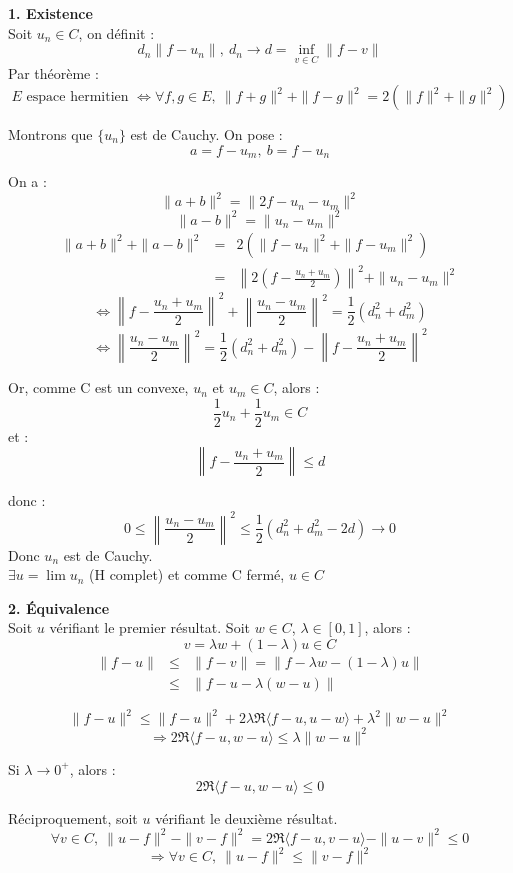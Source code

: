 \begin{dem}
	\textbf{1. Existence}\\
	Soit $u_n\in C$, on définit : 
	\[d_n\|f-u_n\|,\ d_n\to d=\inf_{v\in C} \|f-v\|\]
	Par théorème :
	\[E \text{ espace hermitien } \Leftrightarrow \forall f,g \in E,\ \|f+g\|^2+\|f-g\|^2 = 2(\|f\|^2+\|g\|^2)\]

	Montrons que $\{u_n\}$ est de Cauchy. On pose :
	\[a=f-u_m,\ b=f-u_n\]

	On a :
	\[\|a+b\|^2=\|2f-u_n-u_m\|^2\]
	\[\|a-b\|^2=\|u_n-u_m\|^2\]
	\begin{eqnarray*}
	\|a+b\|^2+\|a-b\|^2&=&2(\|f-u_n\|^2+\|f-u_m\|^2)\\
			&=&\left\|2\left(f-\frac{u_n+u_m}{2} \right)\right\|^2 + \|u_n-u_m\|^2
	\end{eqnarray*}
	\[\Leftrightarrow \left\|f-\frac{u_n+u_m}{2}\right\|^2 + \left\|\frac{u_n-u_m}{2}\right\|^2 = \frac{1}{2} (d_n^2+d_m^2)\]
	\[\Leftrightarrow \left\|\frac{u_n-u_m}{2}\right\|^2 = \frac{1}{2}(d_n^2+d_m^2)-\left\|f-\frac{u_n+u_m}{2}\right\|^2\]

	Or, comme C est un convexe, $u_n$ et $u_m\in C$, alors : 
	\[\frac{1}{2}u_n+\frac{1}{2}u_m\in C\]
	et :
	\[\left\| f-\frac{u_n+u_m}{2}\right\|\leq d\]

	donc :
	\[0 \leq \left\| \frac{u_n-u_m}{2}\right\|^2\leq \frac{1}{2}(d_n^2+d_m^2-2d)\to 0\]
	Donc $u_n$ est de Cauchy. \\
	$\exists u=\lim u_n$ (H complet) et comme C fermé, $u\in C$

	\bigskip
	\textbf{2. Équivalence}\\
	Soit $u$ vérifiant le premier résultat. Soit $w\in C$, $\lambda\in[0,1]$, alors :
	\[v=\lambda w + (1-\lambda)u \in C\]
	\begin{eqnarray*}
		\|f-u\| &\leq& \|f-v\| = \|f-\lambda w -(1-\lambda)u\|\\
			       &\leq& \|f-u-\lambda(w-u)\|
	\end{eqnarray*}

\[\|f-u\|^2\leq \|f-u\|^2+2\lambda\Re\langle f-u,u-w\rangle + \lambda^2\|w-u\|^2\]
\[\Rightarrow 2\Re \langle f-u, w-u\rangle \leq \lambda \|w-u\|^2\]

Si $\lambda\to 0^+$, alors :
\[2\Re \langle f-u, w-u\rangle \leq 0\]

\bigskip
Réciproquement, soit $u$ vérifiant le deuxième résultat.
\[\forall v\in C,\ \|u-f\|^2-\|v-f\|^2=2\Re \langle f-u, v-u\rangle - \|u-v\|^2\leq 0\]
\[\Rightarrow \forall v\in C,\ \|u-f\|^2 \leq \|v-f\|^2\]


\end{dem}
